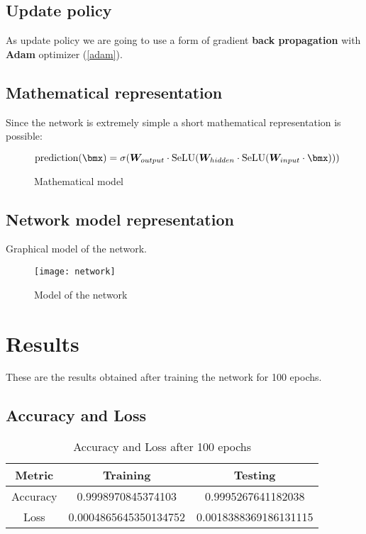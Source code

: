 \section{Update policy}
As update policy we are going to use a form of gradient \textbf{back propagation} with \textbf{Adam} optimizer (\ref{adam}).

\section{Mathematical representation}
Since the network is extremely simple a short mathematical representation is possible:

\begin{figure}
	\[
		\text{prediction}(\bmx) = \sigma(\matr{W}_{output}\cdot\text{SeLU}(\matr{W}_{hidden}\cdot\text{SeLU}(\matr{W}_{input}\cdot\bmx)))
	\]
	\caption{Mathematical model}
\end{figure}

\section{Network model representation}
Graphical model of the network.
\begin{figure}
	\texttt{[image: network]}
	\caption{Model of the network}
\end{figure}

\chapter{Results}

These are the results obtained after training the network for 100 epochs.

\section{Accuracy and Loss}
\begin{table}
	\begin{tabular}{|c|c|c|}
		\hline
		\textbf{Metric} & \textbf{Training}     & \textbf{Testing}      \\
		\hline
		Accuracy        & 0.9998970845374103    & 0.9995267641182038    \\
		\hline
		Loss            & 0.0004865645350134752 & 0.0018388369186131115 \\
		\hline
	\end{tabular}
	\caption{Accuracy and Loss after 100 epochs}
\end{table}

